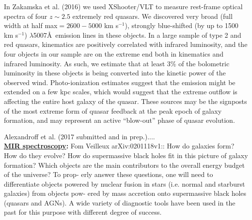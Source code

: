 \smallskip
\smallskip
\noindent
In Zakamska et al. (2016) we used XShooter/VLT to measure rest-frame
optical spectra of four $z\sim 2.5$ extremely red quasars. We
discovered very broad (full width at half max$= 2600-5000$ km
s$^{-1}$), strongly blue-shifted (by up to 1500 km s$^{-1}$)
\oiii$\lambda$5007\AA\ emission lines in these objects. In a large
sample of type 2 and red quasars, \oiii kinematics are positively
correlated with infrared luminosity, and the four objects in our
sample are on the extreme end both in \oiii kinematics and infrared
luminosity.
As such, we estimate that at least 3\% of the bolometric luminosity in
these objects is being converted into the kinetic power of the
observed wind. Photo-ionization estimates suggest that the \oiii
emission might be extended on a few kpc scales, which would suggest
that the extreme outflow is affecting the entire host galaxy of the
quasar. These sources may be the signposts of the most extreme form of
quasar feedback at the peak epoch of galaxy formation, and may
represent an active ``blow-out'' phase of quasar evolution. 


\smallskip
\smallskip
\noindent
Alexandroff et al. (2017 submitted and in prep.).... \\



\medskip
\medskip
\smallskip
\smallskip
\noindent
{\bf \underline{MIR spectroscopy}:}
Fom Veilleux arXiv:0201118v1:: 
How do galaxies form? How do they evolve? How do supermassive black holes fit in this picture of galaxy formation? Which objects are the main contributors to the overall energy budget of the universe? To prop- erly answer these questions, one will need to differentiate objects powered by nuclear fusion in stars (i.e. normal and starburst galaxies) from objects pow- ered by mass accretion onto supermassive black holes (quasars and AGNs). A wide variety of diagnostic tools have been used in the past for this purpose with different degree of success.

